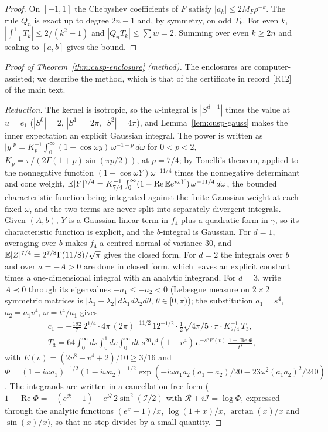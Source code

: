 \begin{proof}
On $[-1,1]$ the Chebyshev coefficients of $F$ satisfy $|a_k|\le2M_F\rho^{-k}$. The rule $Q_n$ is exact up to degree $2n-1$ and, by symmetry, on odd $T_k$. For even $k$, $|\int_{-1}^1T_k|\le2/(k^2-1)$ and $|Q_nT_k|\le\sum w=2$. Summing over even $k\ge2n$ and scaling to $[a,b]$ gives the bound.
\end{proof}

\begin{proof}[Proof of Theorem~\ref{thm:cusp-enclosure} (method)]
The enclosures are computer-assisted; we describe the method, which is that of the certificate in record [R12] of the main text.

\emph{Reduction.} The kernel is isotropic, so the $u$-integral is $|S^{d-1}|$ times the value at $u=e_1$ ($|S^0|=2$, $|S^1|=2\pi$, $|S^2|=4\pi$), and Lemma~\ref{lem:cusp-gauss} makes the inner expectation an explicit Gaussian integral. The power is written as $|y|^p=K_p^{-1}\int_0^\infty(1-\cos\omega y)\,\omega^{-1-p}\,d\omega$ for $0<p<2$, $K_p=\pi/(2\Gamma(1+p)\sin(\pi p/2))$, at $p=7/4$; by Tonelli's theorem, applied to the nonnegative function $(1-\cos\omega Y)\omega^{-11/4}$ times the nonnegative determinant and cone weight, $\mathbb E|Y|^{7/4}=K_{7/4}^{-1}\int_0^\infty(1-\operatorname{Re}\mathbb E e^{i\omega Y})\,\omega^{-11/4}\,d\omega$, the bounded characteristic function being integrated against the finite Gaussian weight at each fixed $\omega$, and the two terms are never split into separately divergent integrals. Given $(A,b)$, $Y$ is a Gaussian linear term in $f_4$ plus a quadratic form in $\gamma$, so its characteristic function is explicit, and the $b$-integral is Gaussian. For $d=1$, averaging over $b$ makes $f_4$ a centred normal of variance $30$, and $\mathbb E|Z|^{7/4}=2^{7/8}\Gamma(11/8)/\sqrt\pi$ gives the closed form. For $d=2$ the integrals over $b$ and over $a=-A>0$ are done in closed form, which leaves an explicit constant times a one-dimensional integral with an analytic integrand. For $d=3$, write $A\prec0$ through its eigenvalues $-a_1\le-a_2<0$ (Lebesgue measure on $2\times2$ symmetric matrices is $|\lambda_1-\lambda_2|\,d\lambda_1d\lambda_2d\theta$, $\theta\in[0,\pi)$); the substitution $a_1=s^4$, $a_2=a_1v^4$, $\omega=t^4/a_1$ gives
\[
\begin{gathered}
c_1=-\frac{192}7\,2^{1/4}\cdot4\pi\,(2\pi)^{-11/2}\,12^{-1/2}\cdot\tfrac12\sqrt{4\pi/5}\cdot\pi\cdot K_{7/4}^{-1}\,T_3,\\
T_3=64\int_0^\infty\!\!ds\int_0^1\!\!dv\int_0^\infty\!\!dt\;s^{20}v^4(1-v^4)\,e^{-s^8E(v)}\,\frac{1-\operatorname{Re}\Phi}{t^8},
\end{gathered}
\]
with $E(v)=(2v^8-v^4+2)/10\ge3/16$ and $\Phi=(1-i\omega a_1)^{-1/2}(1-i\omega a_2)^{-1/2}\exp(-i\omega a_1a_2(a_1+a_2)/20-23\omega^2(a_1a_2)^2/240)$. The integrands are written in a cancellation-free form ($1-\operatorname{Re}\Phi=-(e^{\mathcal R}-1)+e^{\mathcal R}\,2\sin^2(\mathcal I/2)$ with $\mathcal R+i\mathcal I=\log\Phi$, expressed through the analytic functions $(e^x-1)/x$, $\log(1+x)/x$, $\arctan(x)/x$ and $\sin(x)/x$), so that no step divides by a small quantity.


\end{proof}
